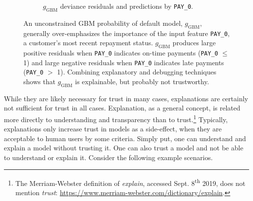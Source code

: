 \documentclass{article}
\begin{document}
\begin{figure}[htb!]
\begin{subfigure}{.5\textwidth}
  		\caption{$g_{\text{GBM}}$ deviance residuals and predictions by \texttt{PAY\_0}.}
  		\label{fig:resid}
	\end{subfigure}
	\caption{An unconstrained GBM probability of default model, $g_{\text{GBM}}$, generally over-emphasizes the importance of the input feature \texttt{PAY\_0}, a customer's most recent repayment status. $g_{\text{GBM}}$ produces large positive residuals when \texttt{PAY\_0} indicates on-time payments (\texttt{PAY\_0} $\leq$ 1) and large negative residuals when \texttt{PAY\_0} indicates late payments (\texttt{PAY\_0} $>$ 1). Combining explanatory and debugging techniques shows that $g_{\text{GBM}}$ is explainable, but probably not trustworthy.}
	\label{fig:global_shap_resid}
\end{figure}

While they are likely necessary for trust in many cases, explanations are certainly not sufficient for trust in all cases. Explanation, as a general concept, is related more directly to understanding and transparency than to trust.\footnote{The Merriam-Webster definition of \textit{explain}, accessed Sept. 8\textsuperscript{th} 2019, does not mention \textit{trust}: \url{https://www.merriam-webster.com/dictionary/explain}.} Typically, explanations only increase trust in models as a side-effect, when they are acceptable to human users by some criteria. Simply put, one can understand and explain a model without trusting it. One can also trust a model and not be able to understand or explain it. Consider the following example scenarios.
\end{document}
